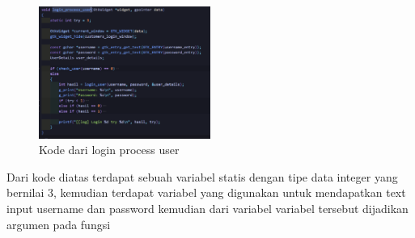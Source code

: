 \documentclass[a4paper,12pt]{article}
\begin{document}
\begin{figure}[!htbp]
    \centering
    \includegraphics[width=0.5\textwidth]{./img/login_process_user.png}
    \caption{Kode dari login process user}
\end{figure}
\FloatBarrier
Dari kode diatas terdapat sebuah variabel statis dengan tipe data integer yang bernilai 3, kemudian terdapat variabel yang digunakan untuk mendapatkan text input username dan password
kemudian dari variabel variabel tersebut dijadikan argumen pada fungsi \texttt{}
\end{document}
